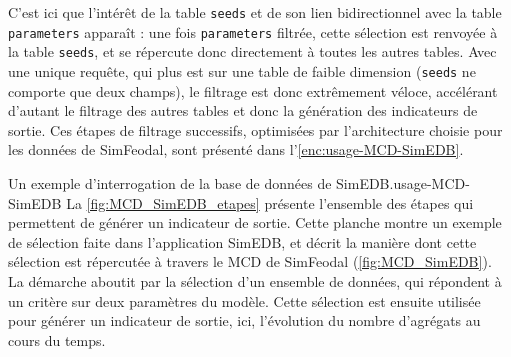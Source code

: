 C'est ici que l'intérêt de la table \texttt{seeds} et de son lien bidirectionnel avec la table \texttt{parameters} apparaît : une fois \texttt{parameters} filtrée, cette sélection est renvoyée à la table \texttt{seeds}, et se répercute donc directement à toutes les autres tables.
Avec une unique requête, qui plus est sur une table de faible dimension (\texttt{seeds} ne comporte que deux champs), le filtrage est donc extrêmement véloce, accélérant d'autant le filtrage des autres tables et donc la génération des indicateurs de sortie.
Ces étapes de filtrage successifs, optimisées par l'architecture choisie pour les données de SimFeodal, sont présenté dans l'\cref{enc:usage-MCD-SimEDB}.

\clearpage

\begin{encadre}{Un exemple d'interrogation de la base de données de SimEDB.}{usage-MCD-SimEDB}
	\renewcommand{\thempfootnote}{\alph{mpfootnote}}
	La \cref{fig:MCD_SimEDB_etapes} présente l'ensemble des étapes qui permettent de générer un indicateur de sortie.
	Cette planche montre un exemple de sélection faite dans l'application SimEDB, et décrit la manière dont cette sélection est répercutée à travers le MCD de SimFeodal (\cref{fig:MCD_SimEDB}).
	La démarche aboutit par la sélection d'un ensemble de données, qui répondent à un critère sur deux paramètres du modèle.
	Cette sélection est ensuite utilisée pour générer un indicateur de sortie, ici, l'évolution du nombre d'agrégats au cours du temps.
	

\end{encadre}

